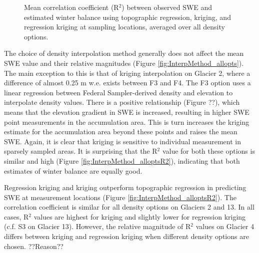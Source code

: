 \documentclass[12pt]{article}
\begin{document}
\begin{figure}
	\caption{Mean correlation coefficient (R$^2$) between observed SWE and estimated winter balance using topographic regression, kriging, and regression kriging at sampling locations, averaged over all density options.}
	\label{fig:InterpMethod_meanR2}
\end{figure}

The choice of density interpolation method generally does not affect the mean SWE value and their relative magnitudes (Figure \ref{fig:InterpMethod_allopts}). The main exception to this is that of kriging interpolation on Glacier 2, where a difference of almost 0.25 m w.e. exists between F3 and F4. The F3 option uses a linear regression between Federal Sampler-derived density and elevation to interpolate density values. There is a positive relationship (Figure ??), which means that the elevation gradient in SWE is increased, resulting in higher SWE point measurements in the accumulation area. This is turn increases the kriging estimate for the accumulation area beyond these points and raises the mean SWE. Again, it is clear that kriging is sensitive to individual measurement in sparsely sampled areas. It is surprising that the R$^2$ value for both these options is similar and high (Figure \ref{fig:InterpMethod_alloptsR2}), indicating that both estimates of winter balance are equally good. 

Regression kriging and kriging outperform topographic regression in predicting SWE at measurement locations (Figure \ref{fig:InterpMethod_alloptsR2}). The correlation coefficient is similar for all density options on Glaciers 2 and 13. In all cases, R$^2$ values are highest for kriging and slightly lower for regression kriging (c.f. S3 on Glacier 13). However, the relative magnitude of R$^2$ values on Glacier 4 differs between kriging and regression kriging when different density options are chosen.  ??Reason??
\end{document}
